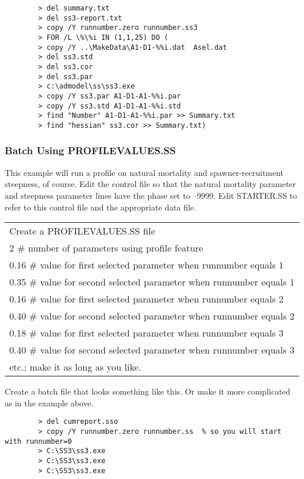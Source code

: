 \begin{verbatim}
		> del summary.txt
		> del ss3-report.txt
		> copy /Y runnumber.zero runnumber.ss3
		> FOR /L \%\%i IN (1,1,25) DO (
		> copy /Y ..\MakeData\A1-D1-%%i.dat  Asel.dat
		> del ss3.std
		> del ss3.cor
		> del ss3.par
		> c:\admodel\ss\ss3.exe
		> copy /Y ss3.par A1-D1-A1-%%i.par
		> copy /Y ss3.std A1-D1-A1-%%i.std
		> find "Number" A1-D1-A1-%%i.par >> Summary.txt
		> find "hessian" ss3.cor >> Summary.txt)
\end{verbatim}


\subsubsection{Batch Using PROFILEVALUES.SS}
This example will run a profile on natural mortality and spawner-recruitment steepness, of course.  Edit the control file so that the natural mortality parameter and steepness parameter lines have the phase set to –9999.  Edit STARTER.SS to refer to this control file and the appropriate data file.

\begin{center}
	\begin{longtable}{p{13cm}}		
		Create a PROFILEVALUES.SS file\\
		2	\# number of parameters using profile feature\\
		0.16	\# value for first selected parameter when runnumber equals 1\\
		0.35	\# value for second selected parameter when runnumber equals 1\\
		0.16	\# value for first selected parameter when runnumber equals 2\\
		0.40	\# value for second selected parameter when runnumber equals 2\\
		0.18	\# value for first selected parameter when runnumber equals 3\\
		0.40	\# value for second selected parameter when runnumber equals 3\\
		etc.;  make it as long as you like.\\
	\end{longtable}
\end{center}

Create a batch file that looks something like this.  Or make it more complicated as in the example above.

\begin{verbatim}
		> del cumreport.sso
		> copy /Y runnumber.zero runnumber.ss  % so you will start with runnumber=0 
		> C:\SS3\ss3.exe 
		> C:\SS3\ss3.exe 
		> C:\SS3\ss3.exe 
\end{verbatim}

